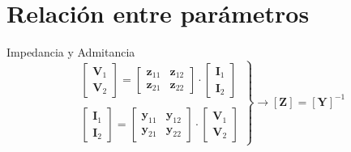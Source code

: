\documentclass[aspectratio=169, usenames,svgnames,dvipsnames]{beamer}
\begin{document}
\section{Relación entre parámetros}
\label{sec:org0662358}

\begin{frame}[label={sec:orgcf4574f}]{Impedancia y Admitancia}
\[
  \left.
    \begin{array}{l}
      \left[
      \begin{array}{c}
        \mathbf{V}_1\\
        \mathbf{V}_2
      \end{array}
      \right] =
      \left[
      \begin{array}{cc}
        \mathbf{z}_{11} & \mathbf{z}_{12}\\
        \mathbf{z}_{21} & \mathbf{z}_{22}
      \end{array}
                          \right]
                          \cdot
                          \left[
                          \begin{array}{c}
                            \mathbf{I}_1\\
                            \mathbf{I}_2
                          \end{array}
      \right] \\ \\
      \left[
      \begin{array}{c}
        \mathbf{I}_1\\
        \mathbf{I}_2
      \end{array}
      \right] =
      \left[
      \begin{array}{cc}
        \mathbf{y}_{11} & \mathbf{y}_{12}\\
        \mathbf{y}_{21} & \mathbf{y}_{22}
      \end{array}
                          \right] \cdot
                          \left[
                          \begin{array}{c}
                            \mathbf{V}_1\\
                            \mathbf{V}_2
                          \end{array}
      \right]
    \end{array}
    \right\}
      \rightarrow
      \boxed{[\mathbf{Z}] = [\mathbf{Y}]^{-1}}
    \]
\end{frame}
\end{document}
